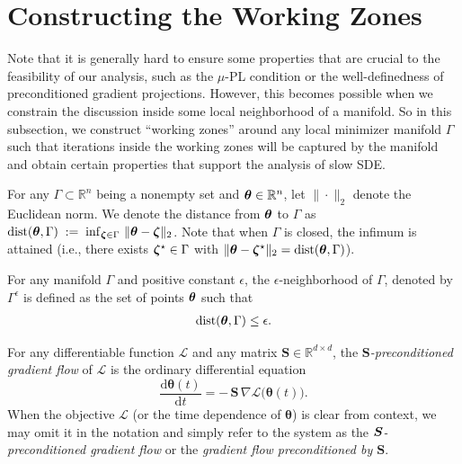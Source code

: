 \section{Constructing the Working Zones}\label{sec:working-zone}

Note that it is generally hard to ensure some properties that are crucial to the feasibility of our analysis, such as the $\mu$-PL condition or the well-definedness of preconditioned gradient projections.
However, this becomes possible when we constrain the discussion inside some local neighborhood of a manifold. So in this subsection, we construct  ``working zones'' around any local minimizer manifold $\Gamma$ such that iterations inside the working zones will be captured by the manifold and obtain certain properties that support the analysis of slow SDE. 



For any $\Gamma \subset \mathbb{R}^n$ being a nonempty set and ${\bm{\theta}} \in \mathbb{R}^n$, let $\|\cdot\|_2$ denote the Euclidean norm. We denote the distance from ${\bm{\theta}}$ to $\Gamma$ as $
  \mathrm{dist}({\bm{\theta}},\Gamma) \;:=\; \inf_{{\bm{\zeta}} \in \Gamma} \, \|{\bm{\theta}} - {\bm{\zeta}}\|_2$. Note that when $\Gamma$ is closed, the infimum is attained (i.e., there exists ${\bm{\zeta}}^\star \in \Gamma$ with $\|{\bm{\theta}}-{\bm{\zeta}}^\star\|_2=\mathrm{dist}({\bm{\theta}},\Gamma)$).

\begin{definition}\label{def:neighborhood-of-manifold}
    For any manifold $\Gamma$ and positive constant $\epsilon$, the $\epsilon$-neighborhood of $\Gamma$, denoted by $\Gamma^{\epsilon}$ is defined as the set of points ${\bm{\theta}}$ such that
    \begin{align*}
        \mathrm{dist}({\bm{\theta}}, \Gamma) \leq \epsilon.
    \end{align*}
\end{definition}


\begin{definition}\label{def:preconditioned-gf}
For any differentiable function \(\mathcal{L}\) and any matrix \(\mathbf{S}\in\mathbb{R}^{d\times d}\), the \emph{\(\mathbf S\)-preconditioned gradient flow} of \(\mathcal L\) is the ordinary differential equation
\[
\frac{\mathrm d\boldsymbol\theta(t)}{\mathrm d t}
= -\,\mathbf S\,\nabla\mathcal L\big(\boldsymbol\theta(t)\big).
\]
When the objective \(\mathcal L\) (or the time dependence of \(\boldsymbol\theta\)) is clear from context, we may omit it in the notation and simply refer to the system as the \emph{${\bm{S}}$-preconditioned gradient flow} or the \emph{gradient flow preconditioned by \(\mathbf S\)}.
\end{definition}


